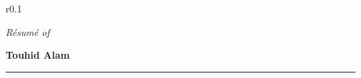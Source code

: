 \begin{wrapfigure}{r}{0.1\textwidth}
\end{wrapfigure}

\begin{center}
  \textit{R\'esum\'e of} \begin{huge}
    \textbf{Touhid Alam}
  \end{huge}
\end{center}

\begin{center}
  \rule{2in}{0.05em}
\end{center}
